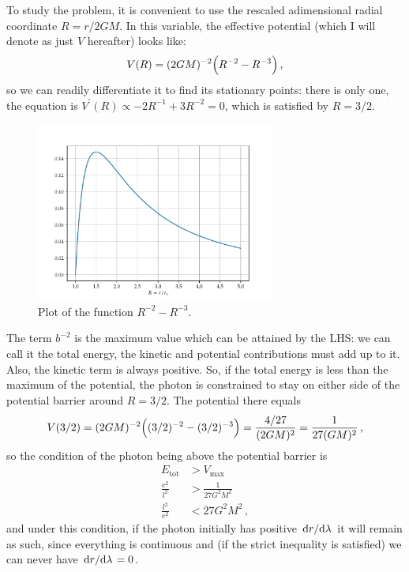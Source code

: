\documentclass[main.tex]{subfiles}
\begin{document}
To study the problem, it is convenient to use the rescaled adimensional radial coordinate \(R = r / 2GM\). In this variable, the effective potential (which I will denote as just \(V\) hereafter) looks like: 
%
\begin{align}
  V (R) = (2GM)^{-2} \qty(R^{-2} - R^{-3})
\,,
\end{align}
%
so we can readily differentiate it to find its stationary points: there is only one, the equation is  \(V^{\prime }(R) \propto -2R^{-1} + 3R^{-2} =0 \), which is satisfied by \(R = 3 / 2\).

\begin{figure}[ht]
    \centering
    \includegraphics[width=0.7\textwidth]{figures/photon_effective_potential.pdf}
    \caption{Plot of the function \(R^{-2} - R^{-3}\).}
    \label{fig:effective-potential}
\end{figure}

The term \(b^{-2}\) is the maximum value which can be attained by the LHS: we can call it the total energy, the kinetic and potential contributions must add up to it. 
Also, the kinetic term is always positive. 
So, if the total energy is less than the maximum of the potential, the photon is constrained to stay on either side of the potential barrier around \(R = 3/2\). The potential there equals 
%
\begin{align}
  V(3/2) = (2GM)^{-2} \qty((3/2)^{-2} - (3/2)^{-3}) 
  = \frac{4/27}{(2GM)^2} = \frac{1}{27 (GM)^2}
\,,
\end{align} 
%
so the condition of the photon being above the potential barrier is 
%
\begin{subequations}
\begin{align}
  E _{\text{tot}} &> V _{\text{max}}  \\
  \frac{e^2}{l^2} &> \frac{1}{27 G^2M^2}  \\
  \frac{l^2}{e ^2} &< 27G^2M^2
\,,
\end{align}
\end{subequations}
%
and under this condition, if the photon initially has positive \(\dv*{r}{\lambda }\) it will remain as such, since everything is continuous and (if the strict inequality is satisfied) we can never have \(\dv*{r}{\lambda }=0\). 
\end{document}
